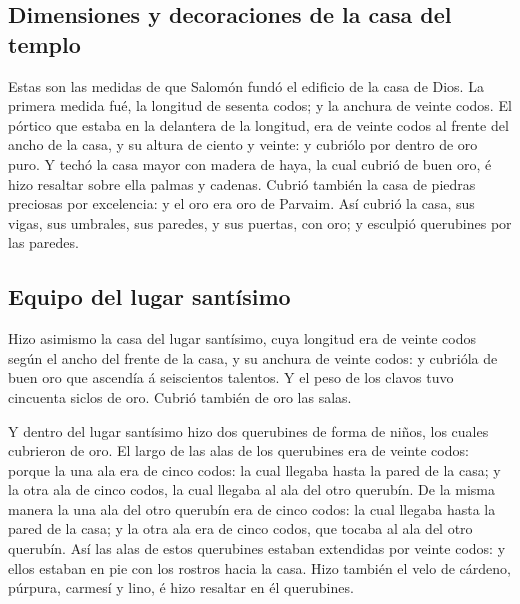 \hypertarget{dimensiones-y-decoraciones-de-la-casa-del-templo}{%
\subsection{Dimensiones y decoraciones de la casa del
templo}\label{dimensiones-y-decoraciones-de-la-casa-del-templo}}

 Estas son las medidas de que Salomón fundó el edificio de
la casa de Dios. La primera medida fué, la longitud de sesenta codos; y
la anchura de veinte codos.  El pórtico que estaba en la
delantera de la longitud, era de veinte codos al frente del ancho de la
casa, y su altura de ciento y veinte: y cubriólo por dentro de oro puro.
 Y techó la casa mayor con madera de haya, la cual cubrió de
buen oro, é hizo resaltar sobre ella palmas y cadenas. 
Cubrió también la casa de piedras preciosas por excelencia: y el oro era
oro de Parvaim.  Así cubrió la casa, sus vigas, sus
umbrales, sus paredes, y sus puertas, con oro; y esculpió querubines por
las paredes.

\hypertarget{equipo-del-lugar-santuxedsimo}{%
\subsection{Equipo del lugar
santísimo}\label{equipo-del-lugar-santuxedsimo}}

 Hizo asimismo la casa del lugar santísimo, cuya longitud
era de veinte codos según el ancho del frente de la casa, y su anchura
de veinte codos: y cubrióla de buen oro que ascendía á seiscientos
talentos.  Y el peso de los clavos tuvo cincuenta siclos de
oro. Cubrió también de oro las salas.

 Y dentro del lugar santísimo hizo dos querubines de forma
de niños, los cuales cubrieron de oro.  El largo de las
alas de los querubines era de veinte codos: porque la una ala era de
cinco codos: la cual llegaba hasta la pared de la casa; y la otra ala de
cinco codos, la cual llegaba al ala del otro querubín.  De
la misma manera la una ala del otro querubín era de cinco codos: la cual
llegaba hasta la pared de la casa; y la otra ala era de cinco codos, que
tocaba al ala del otro querubín.  Así las alas de estos
querubines estaban extendidas por veinte codos: y ellos estaban en pie
con los rostros hacia la casa.  Hizo también el velo de
cárdeno, púrpura, carmesí y lino, é hizo resaltar en él querubines.

